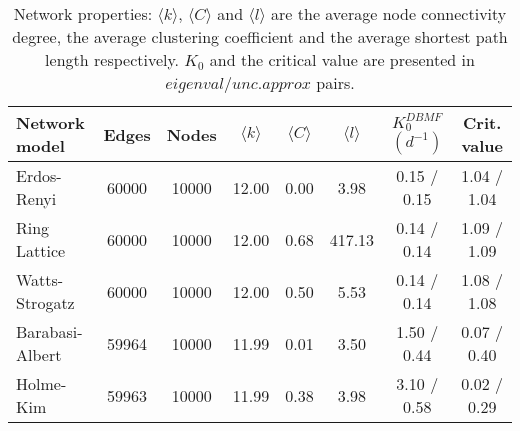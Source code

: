 \begin{table}[h]
\centering
\caption{Network properties: $\langle k \rangle$, $\langle C \rangle$ and $\langle l \rangle$ are the average node connectivity degree, the average clustering coefficient and the average shortest path length respectively. $K_0$ and the critical value are presented in $eigenval/unc.approx$ pairs.}
\label{tab:networks}
\begin{tabular}{lccccccc}
\toprule
         Network model &  Edges &  Nodes & $\langle k \rangle$ & $\langle C \rangle$ & $\langle l \rangle$ & $K_0^{DBMF}$ $(d^{-1})$ & Crit. value \\ 
\midrule
     Erdos-Renyi &  60000 &  10000 & 12.00 &  0.00 &    3.98 & 	  0.15 / 0.15 &   1.04 / 1.04 \\
    Ring Lattice &  60000 &  10000 & 12.00 &  0.68 &  417.13 &    0.14 / 0.14 &   1.09 / 1.09 \\
  Watts-Strogatz &  60000 &  10000 & 12.00 &  0.50 &    5.53 &    0.14 / 0.14 &   1.08 / 1.08 \\
 Barabasi-Albert &  59964 &  10000 & 11.99 &  0.01 &    3.50 &    1.50 / 0.44 &   0.07 / 0.40\\
       Holme-Kim &  59963 &  10000 & 11.99 &  0.38 &    3.98 &    3.10 / 0.58 &   0.02 / 0.29\\
\bottomrule
\end{tabular}
\end{table}
